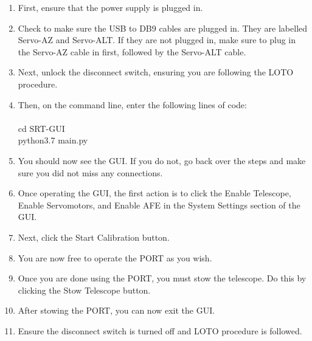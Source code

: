 \documentclass{article}
\begin{document}
\begin{enumerate}
	\item First, ensure that the power supply is plugged in.
	\item Check to make sure the USB to DB9 cables are plugged in. They are labelled Servo-AZ and Servo-ALT. If they are not plugged in, make sure to plug in the Servo-AZ cable in first,         followed by the Servo-ALT cable.
	\item Next, unlock the disconnect switch, ensuring you are following the LOTO procedure.
	\item Then, on the command line, enter the following lines of code:\\
	\\
	\hspace*{10mm} cd SRT-GUI\\
	\hspace*{10mm} python3.7 main.py
	\item  You should now see the GUI. If you do not, go back over the steps and make sure you did not miss any connections.
	\item Once operating the GUI, the first action is to click the Enable Telescope, Enable Servomotors, and Enable AFE in the System Settings section of the GUI.
	\item Next, click the Start Calibration button.
	\item You are now free to operate the PORT as you wish.
	\item Once you are done using the PORT, you must stow the telescope. Do this by clicking the Stow Telescope button.
	\item After stowing the PORT, you can now exit the GUI.
	\item Ensure the disconnect switch is turned off and LOTO procedure is followed.

\end{enumerate}
\end{document}
